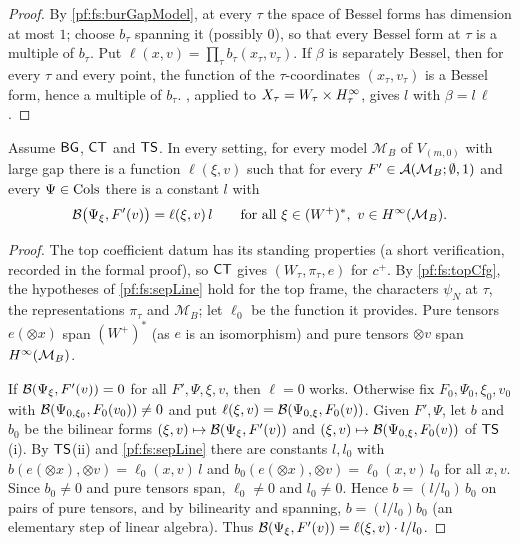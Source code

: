 \begin{proof}
By \cref{pf:fs:burGapModel}, at every $\tau$ the space of Bessel forms has dimension at most $1$; choose $b_\tau$ spanning it
(possibly $0$), so that every Bessel form at $\tau$ is a multiple of $b_\tau$. Put $\ell(x,v)=\prod_\tau b_\tau(x_\tau,v_\tau)$.
If $\beta$ is separately Bessel, then for every $\tau$ and every point, the function of the $\tau$-coordinates
$(x_\tau,v_\tau)$ is a Bessel form, hence a multiple of $b_\tau$. , applied to $X_\tau=W_\tau\times H^{\infty}_\tau$,
gives $l$ with $\beta=l\,\ell$.
\end{proof}

\begin{proposition}\label{pf:fs:topLine}
Assume $\mathsf{BG}$, $\mathsf{CT}$ and $\mathsf{TS}$. In every setting, for every model $\mathcal M_B$ of $V_{(m,0)}$ with large gap there is
a function $\ell(\xi,v)$ such that for every $F'\in\mathcal A(\mathcal M_B;\emptyset,1)$ and every $\Psi\in\mathrm{Cols}$ there is a constant $l$
with
\[
\mathcal B\bigl(\Psi_\xi,F'(v)\bigr)=\ell(\xi,v)\,l\qquad\text{for all }\xi\in(W^+)^*,\ v\in H^{\infty}(\mathcal M_B).
\]
\end{proposition}

\begin{proof}
The top coefficient datum has its standing properties (a short verification, recorded in the formal proof), so $\mathsf{CT}$ gives
$(W_\tau,\pi_\tau,e)$ for $c^+$. By \cref{pf:fs:topCfg}, the hypotheses of \cref{pf:fs:sepLine} hold for the top frame, the characters
$\psi_N$ at $\tau$, the representations $\pi_\tau$ and $\mathcal M_B$; let $\ell_0$ be the function it provides. Pure tensors
$e(\otimes x)$ span $(W^+)^*$ (as $e$ is an isomorphism) and pure tensors $\otimes v$ span $H^{\infty}(\mathcal M_B)$.

If $\mathcal B(\Psi_\xi,F'(v))=0$ for all $F',\Psi,\xi,v$, then $\ell=0$ works. Otherwise fix $F_0,\Psi_0,\xi_0,v_0$ with
$\mathcal B(\Psi_{0,\xi_0},F_0(v_0))\ne0$ and put $\ell(\xi,v)=\mathcal B(\Psi_{0,\xi},F_0(v))$. Given $F',\Psi$, let $b$ and $b_0$ be the bilinear
forms $(\xi,v)\mapsto\mathcal B(\Psi_\xi,F'(v))$ and $(\xi,v)\mapsto\mathcal B(\Psi_{0,\xi},F_0(v))$ of $\mathsf{TS}$(i). By $\mathsf{TS}$(ii) and
\cref{pf:fs:sepLine} there are constants $l,l_0$ with $b(e(\otimes x),\otimes v)=\ell_0(x,v)\,l$ and
$b_0(e(\otimes x),\otimes v)=\ell_0(x,v)\,l_0$ for all $x,v$. Since $b_0\ne0$ and pure tensors span, $\ell_0\ne0$ and $l_0\ne0$. Hence
$b=(l/l_0)\,b_0$ on pairs of pure tensors, and by bilinearity and spanning, $b=(l/l_0)b_0$ (an elementary step of linear algebra). Thus $\mathcal B(\Psi_\xi,F'(v))=\ell(\xi,v)\cdot l/l_0$.
\end{proof}

